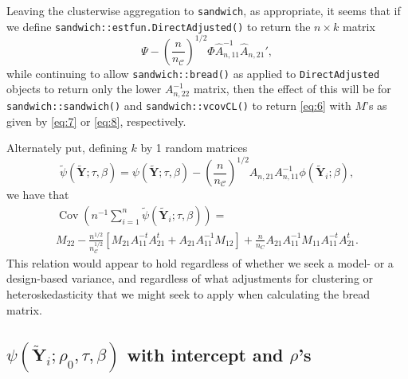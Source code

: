 \documentclass{article}
\begin{document}
Leaving the clusterwise aggregation to \texttt{sandwich}, as
appropriate, it seems that if we define
\texttt{sandwich::estfun.DirectAdjusted()} to return the $n \times k$ matrix
\begin{equation*}
  \Psi -
  \left(\frac{n}{n_{\mathcal{C}}}\right)^{1/2}\Phi
  \hat{A}_{n,11}^{-1}\hat{A}_{n,21}', 
\end{equation*}
while continuing to allow \texttt{sandwich::bread()} as applied to
\texttt{DirectAdjusted} objects to return only
the lower $A_{n,22}^{-1}$ matrix, then the effect of this will be for \texttt{sandwich::sandwich()}
and \texttt{sandwich::vcovCL()} to return \eqref{eq:6} with $M$'s as
given by \eqref{eq:7} or \eqref{eq:8}, respectively.

Alternately put,
defining $k$ by 1 random matrices 
\begin{equation}\label{eq:10}
    \tilde{\psi}(\tilde{\mathbf{Y}}; \tau,
    \beta) = \psi (\tilde{\mathbf{Y}}; \tau,
    \beta) -
    \left(\frac{n}{n_{\mathcal{C}}}\right)^{1/2}
    A_{n,21} A_{n,11}^{-1}\phi(\tilde{\mathbf{Y}}_{i};
    \beta), 
\end{equation}
we have that
\begin{multline*}
  \operatorname{Cov}\left(n^{-1}\sum_{i=1}^{n} \tilde{\psi}(\tilde{\mathbf{Y}}_{i}; \tau,
    \beta)\right) = \\
  M_{22} -
                                 \frac{n^{1/2}}{n_{\mathcal{C}}^{1/2}}[M_{21}A_{11}^{-t}A_{21}^t
                                 + A_{21}A_{11}^{-1}M_{12}] +
                                 \frac{n}{n_C}A_{21}A_{11}^{-1}M_{11}A_{11}^{-t}A_{21}^{t}
                                .
                               \end{multline*}
This relation would appear to hold regardless of whether we seek a model- or a
design-based variance, and regardless of what adjustments for
clustering or heteroskedasticity that we might seek to apply when
calculating the bread matrix. 

\subsection{$\psi(\tilde{\mathbf{Y}}_{i};
  \rho_{0}, \tau, \beta)$ with intercept and $\rho$'s}
\label{sec:psit-rho_0-tau}
\end{document}
